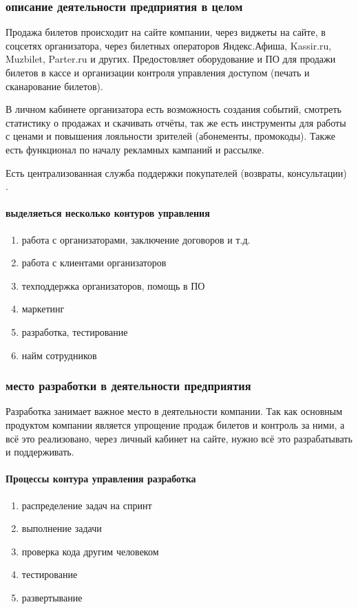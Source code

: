 \documentclass{article}
\begin{document}
\subsubsection{описание деятельности предприятия в целом}
Продажа билетов происходит на сайте компании, через виджеты на сайте, в соцсетях организатора,
через билетных операторов Яндекс.Афиша, Kassir.ru, Muzbilet, Parter.ru и других.
Предостовляет оборудование и ПО для продажи билетов в кассе
и организации контроля управления доступом (печать и сканарование билетов).

В личном кабинете организатора есть возможность создания событий,
смотреть статистику о продажах и скачивать отчёты, так же есть
инструменты для работы с ценами и повышения лояльности зрителей (абонементы, промокоды).
Также есть функционал по началу рекламных кампаний и рассылке.

Есть централизованная служба поддержки покупателей (возвраты, консультации) \cite{radario}.

\paragraph{выделяеться несколько контуров управления}
\begin{enumerate}
    \item{работа с организаторами, заключение договоров и т.д.}
    \item{работа с клиентами организаторов}
    \item{техподдержка организаторов, помощь в ПО}
    \item{маркетинг}
    \item{разработка, тестирование}
    \item{найм сотрудников}
\end{enumerate}

\subsubsection{место разработки в деятельности предприятия}

Разработка занимает важное место в деятельности компании.
Так как основным продуктом компании является упрощение продаж билетов и контроль
за ними, а всё это реализовано, через личный кабинет на сайте, нужно всё это разрабатывать
и поддерживать.

\paragraph{Процессы контура управления разработка \cite{wiki}}
\begin{enumerate}
    \item{распределение задач на спринт}
    \item{выполнение задачи}
    \item{проверка кода другим человеком}
    \item{тестирование}
    \item{развертывание}
\end{enumerate}
\end{document}
